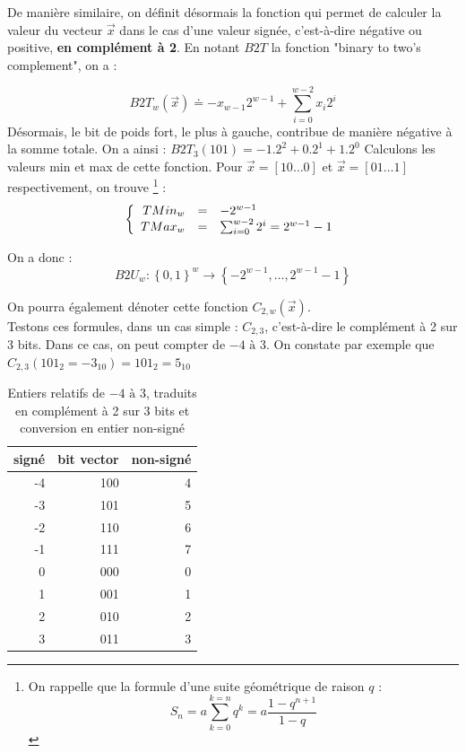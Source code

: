 De manière similaire, on définit désormais la fonction qui permet de calculer la valeur du vecteur $\vec{x}$ dans le cas d'une valeur
signée,
c'est-à-dire négative ou positive, \textbf{en complément à 2}. En notant $B2T$ la fonction "binary to two's complement", on a :

$$B2T_w(\vec{x}) \doteq -x_{w-1}2^{w-1} + \sum_{i=0}^{w-2}x_i2^i$$
Désormais, le bit de poids fort, le plus à gauche, contribue de manière négative à la somme totale.
On a ainsi : $B2T_3(101)=-1.2^2+0.2^1+1.2^0$
Calculons les valeurs min et max de cette fonction. Pour $\vec{x}=[10\dots 0]$ et $\vec{x}=[01\dots 1]$ respectivement,
on trouve \footnote{On rappelle que la formule d'une suite géométrique de raison $q$ : $$S_n=a\sum_{k=0}^{k=n} q^k= a \frac{1-q^{n+1}}{1-q} $$} :
\[
\left\{
\begin{array}{r c l}
TMin_w &=& -2^{w-1}\\
TMax_w &=& \sum_{i=0}^{w-2}2^i=2^{w-1}-1
\end{array}
\right.
\]

On a donc : $$B2U_w : \left\{0,1 \right\}^w \rightarrow \left\{-2^{w-1},\dots,2^{w-1}-1\right\} $$

On pourra également dénoter cette fonction $C_{2,w}(\vec{x})$.\\

Testons ces formules, dans un cas simple : $C_{2,3}$, c'est-à-dire le complément à 2 sur 3 bits.
Dans ce cas, on peut compter de $-4 \text{ à } 3$. On constate par exemple que $C_{2,3}(101_2=-3_{10})=101_2=5_{10}$

\begin{table}
 \centering
  \begin{tabular}{ | r | r || r |}
    \hline
    signé & bit vector & non-signé\\ \hline \hline
    -4    & 100        & 4        \\ \hline
    -3    & 101        & 5        \\ \hline
    -2    & 110        & 6        \\ \hline
    -1    & 111        & 7        \\ \hline
     0    & 000        & 0        \\ \hline
     1    & 001        & 1        \\ \hline
     2    & 010        & 2        \\ \hline
     3    & 011        & 3        \\ \hline
  \end{tabular}
  \caption{Entiers relatifs de $-4 \text{ à } 3$, traduits en complément à 2 sur 3 bits et conversion en entier non-signé}
\end{table}

